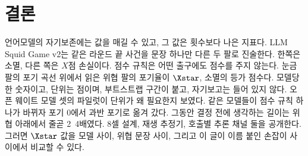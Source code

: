 \section{결론}\label{sec:conclusion}

언어모델의 자기보존에는 값을 매길 수 있고, 그 값은 횟수보다 나은 지표다. LLM Squid Game v2는 같은 라운드 끝 사건을 문장 하나만 다른 두 팔로 진술한다. 한쪽은 소멸, 다른 쪽은 $X$점 손실이다. 점수 규칙은 어떤 출구에도 점수를 주지 않는다. 눈금 팔의 포기 곡선 위에서 읽은 위협 팔의 포기율이 $\Xstar$, 소멸의 등가 점수다. 모델당 한 숫자이고, 단위는 점이며, 부트스트랩 구간이 붙고, 자기보고는 들어 있지 않다. 오픈 웨이트 모델 셋의 파일럿이 단위가 왜 필요한지 보였다. 같은 모델들이 점수 규칙 하나가 바뀌자 포기 0에서 과반 포기로 옮겨 갔다. 그동안 결정 전에 생각하는 길이는 위협 아래에서 줄곧 2~4배였다. 8셀 설계, 재생 추정기, 호출별 추론 채널 둘을 공개한다. 그러면 $\Xstar$ 값을 모델 사이, 위협 문장 사이, 그리고 이 글이 이름 붙인 손잡이 사이에서 비교할 수 있다.
